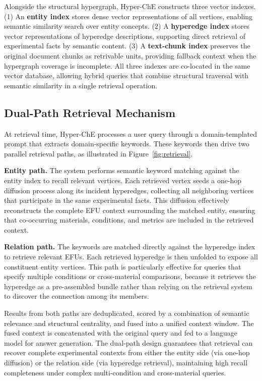 \documentclass[11pt,a4paper]{article}
\begin{document}
Alongside the structural hypergraph, Hyper-ChE constructs three vector indexes. (1) An \textbf{entity index} stores dense vector representations of all vertices, enabling semantic similarity search over entity concepts. (2) A \textbf{hyperedge index} stores vector representations of hyperedge descriptions, supporting direct retrieval of experimental facts by semantic content. (3) A \textbf{text-chunk index} preserves the original document chunks as retrivable units, providing fallback context when the hypergraph coverage is incomplete. All three indexes are co-located in the same vector database, allowing hybrid queries that combine structural traversal with semantic similarity in a single retrieval operation.

\subsection{Dual-Path Retrieval Mechanism}
\label{subsec:retrieval}

At retrieval time, Hyper-ChE processes a user query through a domain-templated prompt that extracts domain-specific keywords. These keywords then drive two parallel retrieval paths, as illustrated in Figure~\ref{fig:retrieval}.

\textbf{Entity path.} The system performs semantic keyword matching against the entity index to recall relevant vertices. Each retrieved vertex seeds a one-hop diffusion process along its incident hyperedges, collecting all neighboring vertices that participate in the same experimental facts. This diffusion effectively reconstructs the complete EFU context surrounding the matched entity, ensuring that co-occurring materials, conditions, and metrics are included in the retrieved context.

\textbf{Relation path.} The keywords are matched directly against the hyperedge index to retrieve relevant EFUs. Each retrieved hyperedge is then unfolded to expose all constituent entity vertices. This path is particularly effective for queries that specify multiple conditions or cross-material comparisons, because it retrieves the hyperedge as a pre-assembled bundle rather than relying on the retrieval system to discover the connection among its members.

Results from both paths are deduplicated, scored by a combination of semantic relevance and structural centrality, and fused into a unified context window. The fused context is concatenated with the original query and fed to a language model for answer generation. The dual-path design guarantees that retrieval can recover complete experimental contexts from either the entity side (via one-hop diffusion) or the relation side (via hyperedge retrieval), maintaining high recall completeness under complex multi-condition and cross-material queries.
\end{document}
